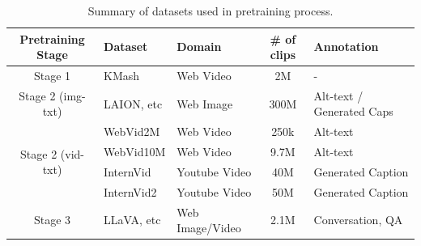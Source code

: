 \begin{table}[t]
\centering
\caption{Summary of datasets used in \modelname{} pretraining process.}
\resizebox{0.8\textwidth}{!}
{
\begin{tabular}{cllcl}
\toprule
Pretraining Stage & {Dataset}                         & Domain            & \# of clips & Annotation            \\ \midrule
\multicolumn{1}{c|}{Stage 1} & KMash & Web Video & 2M & - \\
\midrule
\multicolumn{1}{c|}{Stage 2 (img-txt)} & LAION, etc & Web Image & 300M & Alt-text / Generated Caps \\
\hline
\multicolumn{1}{c|}{\multirow{4}{*}{Stage 2 (vid-txt)}} & WebVid2M     & Web Video         & 250k        & Alt-text               \\
\multicolumn{1}{c|}{}                              & WebVid10M    & Web Video         & 9.7M        & Alt-text               \\
\multicolumn{1}{c|}{}                              & InternVid    & Youtube Video     & 40M         & Generated Caption     \\
\multicolumn{1}{c|}{}                              & InternVid2 & Youtube Video     & 50M         & Generated Caption     \\ 
\midrule
\multicolumn{1}{c|}{Stage 3} & LLaVA, etc  & Web Image/Video         & 2.1M        & Conversation, QA  \\
\bottomrule
\end{tabular}
}
\label{tab:pretrain_data}
\end{table}